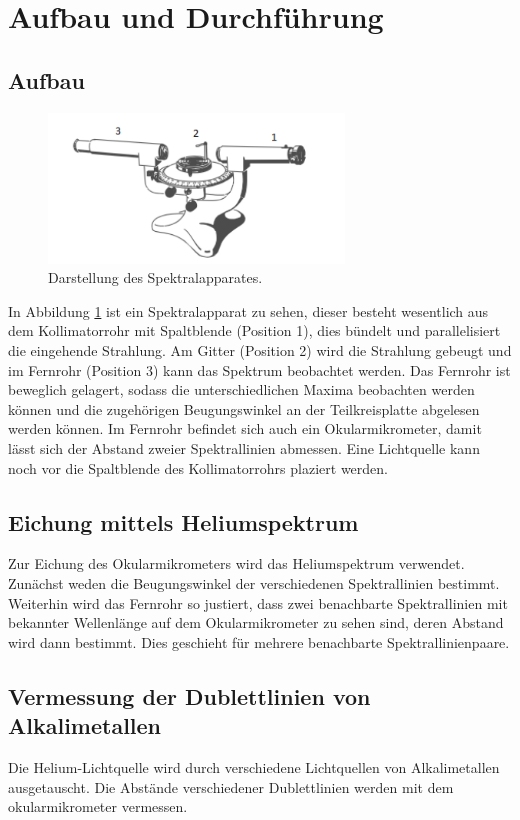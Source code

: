 
\section{Aufbau und Durchführung}
\label{sec:Durchführung}
\subsection{Aufbau}
\begin{figure}
 \centering
 \includegraphics[width=0.7\textwidth]{Aufbau.png}
 \caption{Darstellung des Spektralapparates.}
 \label{fig:apparat}
 \end{figure}
In Abbildung \ref{fig:apparat} ist ein Spektralapparat zu sehen, dieser besteht wesentlich aus dem Kollimatorrohr mit Spaltblende (Position 1), dies bündelt und parallelisiert die eingehende Strahlung.
Am Gitter (Position 2) wird die Strahlung gebeugt und im Fernrohr (Position 3) kann das Spektrum beobachtet werden. Das Fernrohr ist beweglich gelagert, sodass die unterschiedlichen Maxima
beobachten werden können und die zugehörigen Beugungswinkel an der Teilkreisplatte abgelesen werden können. Im Fernrohr befindet sich auch ein Okularmikrometer, damit lässt sich der Abstand
zweier Spektrallinien abmessen.
Eine Lichtquelle kann noch vor die Spaltblende des Kollimatorrohrs plaziert werden.

\subsection{Eichung mittels Heliumspektrum}
Zur Eichung des Okularmikrometers wird das Heliumspektrum verwendet. Zunächst weden die Beugungswinkel der verschiedenen Spektrallinien bestimmt.
Weiterhin wird das Fernrohr so justiert, dass zwei benachbarte Spektrallinien mit bekannter Wellenlänge auf dem Okularmikrometer zu sehen sind, deren Abstand wird dann bestimmt.
Dies geschieht für mehrere benachbarte Spektrallinienpaare.

\subsection{Vermessung der Dublettlinien von Alkalimetallen}
Die Helium-Lichtquelle wird durch verschiedene Lichtquellen von Alkalimetallen ausgetauscht.
Die Abstände verschiedener Dublettlinien werden mit dem okularmikrometer vermessen.
